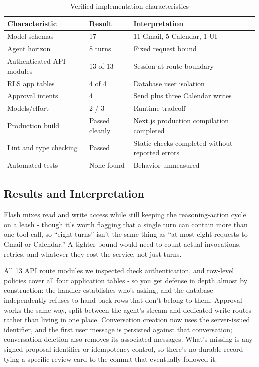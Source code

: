 \documentclass[conference]{IEEEtran}
\begin{document}
\begin{table}[t]
\centering
\caption{Verified implementation characteristics}
\scriptsize
\begin{tabularx}{\columnwidth}{@{}YY Y@{}}
\toprule
\textbf{Characteristic} & \textbf{Result} & \textbf{Interpretation} \\
\midrule
Model schemas & 17 & 11 Gmail, 5 Calendar, 1 UI \\
Agent horizon & 8 turns & Fixed request bound \\
Authenticated API modules & 13 of 13 & Session at route boundary \\
RLS app tables & 4 of 4 & Database user isolation \\
Approval intents & 4 & Send plus three Calendar writes \\
Models/effort & 2 / 3 & Runtime tradeoff \\
Production build & Passed cleanly & Next.js production compilation completed \\
Lint and type checking & Passed & Static checks completed without reported errors \\
Automated tests & None found & Behavior unmeasured \\
\bottomrule
\end{tabularx}
\end{table}

\subsection{Results and Interpretation}

Flash mixes read and write access while still keeping the reasoning-action cycle on a leash - though it's worth flagging that a single turn can contain more than one tool call, so ``eight turns'' isn't the same thing as ``at most eight requests to Gmail or Calendar.'' A tighter bound would need to count actual invocations, retries, and whatever they cost the service, not just turns.

All 13 API route modules we inspected check authentication, and row-level policies cover all four application tables - so you get defense in depth almost by construction: the handler establishes who's asking, and the database independently refuses to hand back rows that don't belong to them. Approval works the same way, split between the agent's stream and dedicated write routes rather than living in one place. Conversation creation now uses the server-issued identifier, and the first user message is persisted against that conversation; conversation deletion also removes its associated messages. What's missing is any signed proposal identifier or idempotency control, so there's no durable record tying a specific review card to the commit that eventually followed it.
\end{document}
